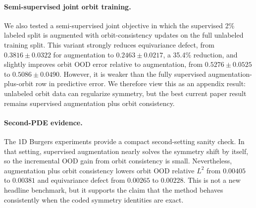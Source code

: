 \begin{table}[t]
\centering
\small
\caption{Unlabeled target-input adaptation at 2\% labels. Rows show projection-head adaptation with orbit preservation for five epochs. Negative OOD delta means lower post-adaptation OOD error; ID drift is the signed change in in-distribution relative \(L^2\).}
\label{tab:new-target-adaptation}
\end{table}

\paragraph{Semi-supervised joint orbit training.} We also tested a semi-supervised joint objective in which the supervised 2\% labeled split is augmented with orbit-consistency updates on the full unlabeled training split. This variant strongly reduces equivariance defect, from \(0.3816\pm0.0322\) for augmentation to \(0.2463\pm0.0217\), a 35.4\% reduction, and slightly improves orbit OOD error relative to augmentation, from \(0.5276\pm0.0525\) to \(0.5086\pm0.0490\). However, it is weaker than the fully supervised augmentation-plus-orbit row in predictive error. We therefore view this as an appendix result: unlabeled orbit data can regularize symmetry, but the best current paper result remains supervised augmentation plus orbit consistency.

\paragraph{Second-PDE evidence.} The 1D Burgers experiments provide a compact second-setting sanity check. In that setting, supervised augmentation nearly solves the symmetry shift by itself, so the incremental OOD gain from orbit consistency is small. Nevertheless, augmentation plus orbit consistency lowers orbit OOD relative \(L^2\) from \(0.00405\) to \(0.00381\) and equivariance defect from \(0.00265\) to \(0.00228\). This is not a new headline benchmark, but it supports the claim that the method behaves consistently when the coded symmetry identities are exact.

